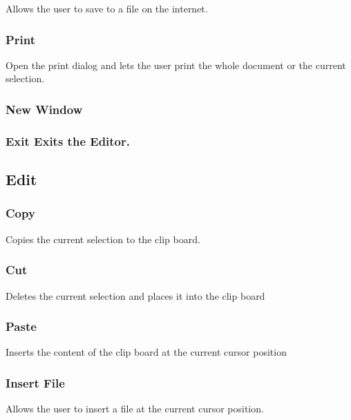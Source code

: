 \documentclass{article}
\begin{document}
Allows the user to save to a file on the internet.


\subsubsection{Print}

Open the print dialog and lets the user print the whole document or the current selection.


\subsubsection{New Window}




\subsubsection{Exit
Exits the Editor. }








\subsection{Edit}




\subsubsection{Copy }

Copies the current selection to the clip board.


\subsubsection{Cut}

Deletes the current selection and places it into the clip board


\subsubsection{Paste}

Inserts the content of the clip board at the current cursor position


\subsubsection{Insert File }

Allows the user to insert a file at the current cursor position.
\end{document}
